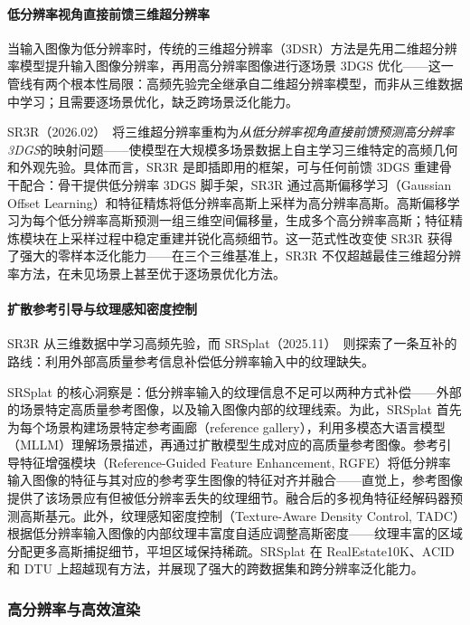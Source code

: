 \paragraph{低分辨率视角直接前馈三维超分辨率}

当输入图像为低分辨率时，传统的三维超分辨率（3DSR）方法是先用二维超分辨率模型提升输入图像分辨率，再用高分辨率图像进行逐场景 3DGS 优化——这一管线有两个根本性局限：高频先验完全继承自二维超分辨率模型，而非从三维数据中学习；且需要逐场景优化，缺乏跨场景泛化能力。

SR3R（2026.02）~\cite{2602_24020}将三维超分辨率重构为\emph{从低分辨率视角直接前馈预测高分辨率 3DGS}的映射问题——使模型在大规模多场景数据上自主学习三维特定的高频几何和外观先验。具体而言，SR3R 是即插即用的框架，可与任何前馈 3DGS 重建骨干配合：骨干提供低分辨率 3DGS 脚手架，SR3R 通过高斯偏移学习（Gaussian Offset Learning）和特征精炼将低分辨率高斯上采样为高分辨率高斯。高斯偏移学习为每个低分辨率高斯预测一组三维空间偏移量，生成多个高分辨率高斯；特征精炼模块在上采样过程中稳定重建并锐化高频细节。这一范式性改变使 SR3R 获得了强大的零样本泛化能力——在三个三维基准上，SR3R 不仅超越最佳三维超分辨率方法，在未见场景上甚至优于逐场景优化方法。

\paragraph{扩散参考引导与纹理感知密度控制}

SR3R 从三维数据中学习高频先验，而 SRSplat（2025.11）~\cite{2511_12040}则探索了一条互补的路线：利用外部高质量参考信息补偿低分辨率输入中的纹理缺失。

SRSplat 的核心洞察是：低分辨率输入的纹理信息不足可以两种方式补偿——外部的场景特定高质量参考图像，以及输入图像内部的纹理线索。为此，SRSplat 首先为每个场景构建场景特定参考画廊（reference gallery），利用多模态大语言模型（MLLM）理解场景描述，再通过扩散模型生成对应的高质量参考图像。参考引导特征增强模块（Reference-Guided Feature Enhancement, RGFE）将低分辨率输入图像的特征与其对应的参考孪生图像的特征对齐并融合——直觉上，参考图像提供了该场景应有但被低分辨率丢失的纹理细节。融合后的多视角特征经解码器预测高斯基元。此外，纹理感知密度控制（Texture-Aware Density Control, TADC）根据低分辨率输入图像的内部纹理丰富度自适应调整高斯密度——纹理丰富的区域分配更多高斯捕捉细节，平坦区域保持稀疏。SRSplat 在 RealEstate10K、ACID 和 DTU 上超越现有方法，并展现了强大的跨数据集和跨分辨率泛化能力。

\subsubsection{高分辨率与高效渲染}

